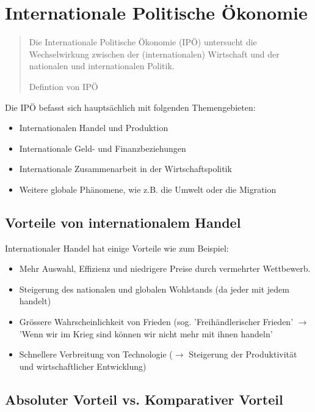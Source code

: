 \documentclass[a4paper, 11pt]{article}
\begin{document}
\section{Internationale Politische Ökonomie}

\begin{center}
	\blockquote[Defintion von IPÖ]{Die Internationale Politische Ökonomie (IPÖ) untersucht die Wechselwirkung zwischen der (internationalen) Wirtschaft und der nationalen und internationalen Politik. \\}
\end{center}

Die IPÖ befasst sich hauptsächlich mit folgenden Themengebieten:

\begin{itemize}
	\item Internationalen Handel und Produktion
	\item Internationale Geld- und Finanzbeziehungen
	\item Internationale Zusammenarbeit in der Wirtschaftspolitik
	\item Weitere globale Phänomene, wie z.B. die Umwelt oder die Migration
\end{itemize}

\subsection{Vorteile von internationalem Handel}

Internationaler Handel hat einige Vorteile wie zum Beispiel:

\begin{itemize}
	\item Mehr Auswahl, Effizienz und niedrigere Preise durch vermehrter Wettbewerb.
	\item Steigerung des nationalen und globalen Wohlstands (da jeder mit jedem handelt)
	\item Grössere Wahrscheinlichkeit von Frieden (sog. 'Freihändlerischer Frieden' $\rightarrow$ 'Wenn wir im Krieg sind können wir nicht mehr mit ihnen handeln'
	\item Schnellere Verbreitung von Technologie ($\rightarrow$ Steigerung der Produktivität und wirtschaftlicher Entwicklung)
\end{itemize}

\subsection{Absoluter Vorteil vs. Komparativer Vorteil}
\end{document}
